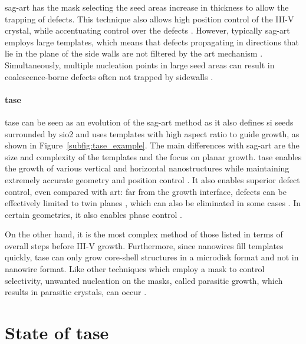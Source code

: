 \acs{sag}-\acs{art} has the mask selecting the seed areas increase in thickness to allow the trapping of defects. This technique also allows high position control of the III-V crystal, while accentuating control over the defects \cite{Han2016, Han2016_2}. However, typically \acs{sag}-\acs{art} employs large templates, which means that defects propagating in directions that lie in the plane of the side walls are not filtered by the \acs{art} mechanism \cite{Kunert2018}. Simultaneously, multiple nucleation points in large seed areas can result in coalescence-borne defects often not trapped by sidewalls \cite{Kunert2016}.
\par
\paragraph{\Acf{tase}} \acs{tase} can be seen as an evolution of the \acs{sag}-\acs{art} method as it also defines \acl{si} seeds surrounded by \acs{sio2} and uses templates with high aspect ratio to guide growth, as shown in Figure~\ref{subfig:tase_example}. The main differences with \acs{sag}-\acs{art} are the size and complexity of the templates and the focus on planar growth. \acs{tase} enables the growth of various vertical and horizontal nanostructures while maintaining extremely accurate geometry and position control \cite{Ritter2021, Tiwari2020, Schmid2015}. It also enables superior defect control, even compared with \acs{art}: far from the growth interface, defects can be effectively limited to twin planes \cite{Han2020}, which can also be eliminated in some cases \cite{Knoedler2017}. In certain geometries, it also enables phase control \cite{Staudinger2018}. 

On the other hand, it is the most complex method of those listed in terms of overall steps before III-V growth. Furthermore, since nanowires fill templates quickly, \acs{tase} can only grow core-shell structures in a microdisk format \cite{Tiwari2020} and not in nanowire format. Like other techniques which employ a mask to control selectivity, unwanted nucleation on the masks, called parasitic growth, which results in parasitic crystals, can occur \cite{Goswami2021}.
\par

\section{\texorpdfstring{State of \acl{tase}}{State of template assisted selective epitaxy}}

